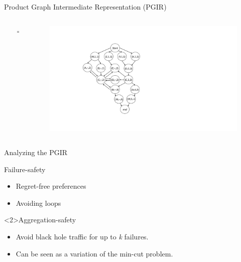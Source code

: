 \begin{frame}{Product Graph Intermediate Representation (PGIR)}
\begin{columns}
\begin{column}{0.35\textwidth}
{
            }
        \end{column}
        \begin{column}{0.01\textwidth}
             $\Rightarrow$
        \end{column}
        \begin{column}{0.45\textwidth}
            \begin{figure}[htb]
                \includegraphics[height=\textheight,keepaspectratio,clip,trim={5cm 0cm 16cm 2cm}]{figures/pgir.pdf}
            \end{figure}
        \end{column}
    \end{columns}
\end{frame}

\begin{frame}{Analyzing the PGIR}
    \begin{block}{Failure-safety}
        \begin{itemize}
            \item Regret-free preferences
            \item Avoiding loops
        \end{itemize}
    \end{block}
    \begin{block}<2>{Aggregation-safety}
        \begin{itemize}
            \item Avoid black hole traffic for up to \textit{k} failures.
            \item Can be seen as a variation of the min-cut problem.
        \end{itemize}
    \end{block}
\end{frame}

